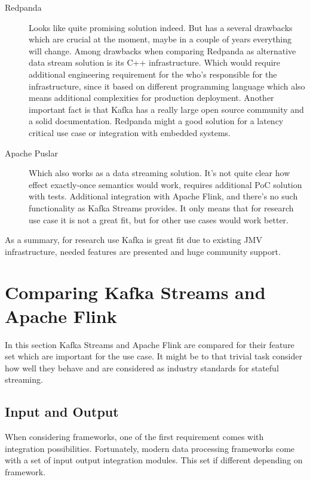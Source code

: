 \begin{description}
    \item[Redpanda] Looks like quite promising solution indeed.
    But has a several drawbacks which are crucial at the moment, maybe in
    a couple of years everything will change.
    Among drawbacks when comparing Redpanda as alternative data stream solution
    is its C++ infrastructure.
    Which would require additional engineering requirement for the who's
    responsible for the infrastructure, since it based on different programming
    language which also means additional complexities for production deployment.
    Another important fact is that Kafka has a really large open source community
    and a solid documentation.
    Redpanda might a good solution for a latency critical use case or integration with
    embedded systems.
    \item[Apache Puslar] Which also works as a data streaming solution.
    It's not quite clear how effect exactly-once semantics would work,
    requires additional PoC solution with tests.
    Additional integration with Apache Flink, and there's no such functionality
    as Kafka Streams provides.
    It only means that for research use case it is not a great fit, but for other use cases
    would work better.
\end{description}

As a summary, for research use Kafka is great fit due to existing JMV
infrastructure, needed features are presented and huge community support.


\newpage
\section{Comparing Kafka Streams and Apache Flink}\label{sec:kafka-vs-flink}
In this section Kafka Streams and Apache Flink are compared for their
feature set which are important for the use case.
It might be to that trivial task consider how well they behave and are considered as
industry standards for stateful streaming.


\subsection{Input and Output}\label{subsec:input-and-output}
When considering frameworks, one of the first requirement comes
with integration possibilities.
Fortunately, modern data processing frameworks come with a set of
input output integration modules.
This set if different depending on framework.

